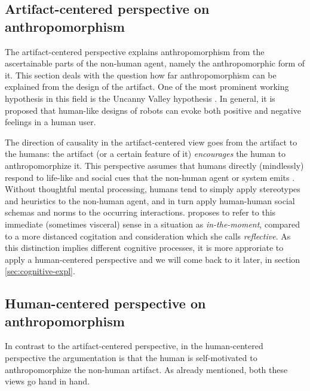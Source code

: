 \documentclass{frontiersSCNS} %
\begin{document}
\subsection{Artifact-centered perspective on anthropomorphism}

The artifact-centered perspective explains anthropomorphism from the
ascertainable parts of the non-human agent, namely the anthropomorphic form of
it. This section deals with the question how far anthropomorphism can be
explained from the design of the artifact.  One of the most prominent working
hypothesis in this field is the Uncanny Valley hypothesis
\citep{mori_uncanny_1970}. In general, it is proposed that human-like designs of
robots can evoke both positive and negative feelings in a human user. 

The direction of causality in the artifact-centered view goes from the artifact
to the humans: the artifact (or a certain feature of it) \emph{encourages} the
human to anthropomorphize it.  This perspective assumes that humans directly
(mindlessly) respond to life-like and social cues that the non-human agent or
system emits \citep{nass_machines_2000}. Without thoughtful mental processing,
humans tend to simply apply stereotypes and heuristics to the non-human agent,
and in turn apply human-human social schemas and norms to the occurring
interactions.  \cite{takayama_perspectives_2012} proposes to refer to this
immediate (sometimes visceral) sense in a situation as \textit{in-the-moment},
compared to a more distanced cogitation and consideration which she calls
\textit{reflective}. As this distinction implies different cognitive processes,
it is more approriate to apply a human-centered perspective and we will come
back to it later, in section \ref{sec:cognitive-expl}.


%
%
%
%
%
%

\subsection{Human-centered perspective on anthropomorphism}

In contrast to the artifact-centered perspective, in the human-centered
perspective the argumentation is that the human is self-motivated to
anthropomorphize the non-human artifact. As already mentioned, both these views
go hand in hand.
\end{document}
